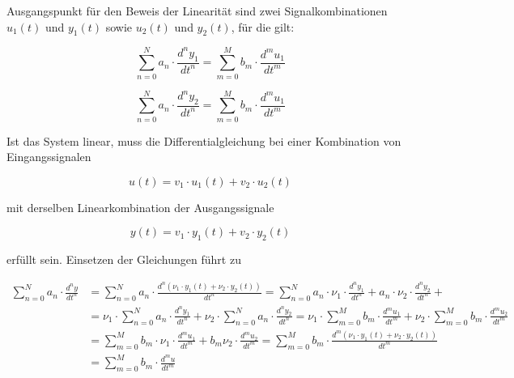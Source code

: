 \noindent Ausgangspunkt für den Beweis der Linearität sind zwei Signalkombinationen $u_{1}(t)$  und $y_{1}(t)$ sowie $u_{2}(t)$ und $y_{2}(t)$, für die gilt:

\begin{equation}\label{eq:threefourtyseven}
\sum_{n=0}^{N}a_{n} \cdot  \frac{d^ny_{1}}{dt^n} =
\sum_{m=0}^{M}b_{m} \cdot  \frac{d^mu_{1}}{dt^m}
\end{equation}

\begin{equation}\label{eq:threefourtyeight}
\sum_{n=0}^{N}a_{n} \cdot  \frac{d^ny_{2}}{dt^n} =
\sum_{m=0}^{M}b_{m} \cdot  \frac{d^mu_{1}}{dt^m}
\end{equation}

\noindent Ist das System linear, muss die Differentialgleichung bei einer Kombination von Eingangssignalen

\begin{equation}\label{eq:threefourtynine}
u(t)=v_{1}\cdot u_{1}(t)+v_{2}\cdot u_{2}(t)
\end{equation}

\noindent mit derselben Linearkombination der Ausgangssignale

\begin{equation}\label{eq:threefifty}
y(t)=v_{1}\cdot y_{1}(t)+v_{2}\cdot y_{2}(t)
\end{equation}

\noindent erfüllt sein. Einsetzen der Gleichungen führt zu

\begin{equation}\label{eq:threefiftyone}
\begin{split}
\sum _{n=0}^{N}a_{n} \cdot \frac{d^{n} y}{dt^{n} }   & = \sum _{n=0}^{N}a_{n} \cdot \frac{d^{n} \left(\nu _{1} \cdot y_{1} \left(t\right)+\nu _{2} \cdot y_{2} \left(t\right)\right)}{dt^{n} }  =\sum _{n=0}^{N}a_{n} \cdot \nu _{1} \cdot \frac{d^{n} y_{1} }{dt^{n} } +a_{n} \cdot \nu _{2} \cdot \frac{d^{n} y_{2} }{dt^{n} }  + \\ 
& =\nu _{1} \cdot \sum _{n=0}^{N}a_{n} \cdot \frac{d^{n} y_{1} }{dt^{n} }  +\nu _{2} \cdot \sum _{n=0}^{N}a_{n} \cdot \frac{d^{n} y_{2} }{dt^{n} }  =\nu _{1} \cdot \sum _{m=0}^{M}b_{m} \cdot \frac{d^{m} u_{1} }{dt^{m} }  +\nu _{2} \cdot \sum _{m=0}^{M}b_{m} \cdot \frac{d^{m} u_{2} }{dt^{m} }\\ 
& = \sum _{m=0}^{M}b_{m} \cdot \nu _{1}  \cdot \frac{d^{m} u_{1} }{dt^{m} } + b_{m} \nu _{2} \cdot \frac{d^{m} u_{2} }{dt^{m}} = \sum _{m=0}^{M}b_{m} \cdot \frac{d^{m} \left(\nu _{1} \cdot y_{1} \left(t\right)+\nu _{2} \cdot y_{2} \left(t\right)\right)}{dt^{m} }\\
& = \sum _{m=0}^{M}b_{m} \cdot \frac{d^{m}u}{dt^{m}}
\end{split}
\end{equation}


